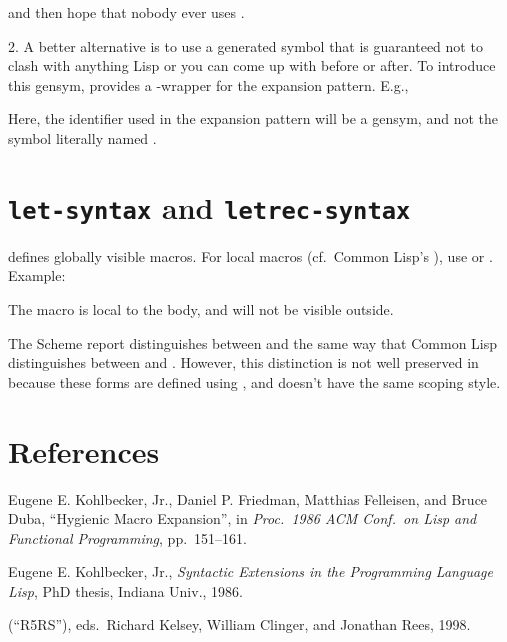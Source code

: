 and then hope that nobody ever uses .

2.  A better alternative is to use a generated symbol that
is guaranteed not to clash with anything Lisp or you can
come up with before or after.  To introduce this gensym,
 provides a -wrapper for the expansion
pattern.  E.g.,


Here, the  identifier used in the expansion pattern
will be a gensym, and not the symbol literally named
.

\section{{\tt let-syntax} and {\tt letrec-syntax}}


 defines globally visible macros.  For
local macros (cf.\ Common Lisp's ), use
 or .  Example:


The  macro is local to the  body,
and will not be visible outside.

The Scheme report distinguishes between
 and  the same way that
Common Lisp distinguishes between  and .
However, this distinction is not well preserved in 
because these forms are defined using , and
 doesn't have the same scoping style.

\section{References}

 Eugene E. Kohlbecker, Jr., Daniel
P. Friedman, Matthias Felleisen, and Bruce Duba, ``Hygienic
Macro Expansion'', in {\it Proc.\ 1986 ACM Conf.\ on Lisp
and Functional Programming}, pp.\ 151--161.

 Eugene E. Kohlbecker, Jr.,  {\it
Syntactic
Extensions in the Programming Language Lisp}, PhD thesis,
Indiana Univ., 1986.

 (``R5RS''), eds.\ Richard
Kelsey, William Clinger, and Jonathan Rees, 1998.
\endthebibliography

\bye
